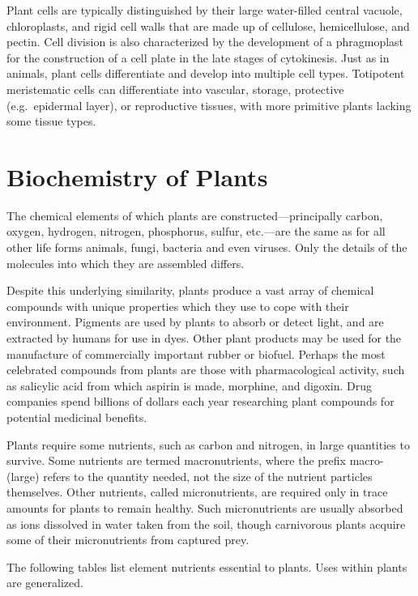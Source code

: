 Plant cells are typically distinguished by their large water-filled central vacuole, chloroplasts, and rigid cell walls that are made up of cellulose, hemicellulose, and pectin. Cell division is also characterized by the development of a phragmoplast for the construction of a cell plate in the late stages of cytokinesis. Just as in animals, plant cells differentiate and develop into multiple cell types. Totipotent meristematic cells can differentiate into vascular, storage, protective (e.g.~epidermal layer), or reproductive tissues, with more primitive plants lacking some tissue types.

\hypertarget{biochemistry-of-plants}{%
\section{Biochemistry of Plants}\label{biochemistry-of-plants}}

The chemical elements of which plants are constructed---principally carbon, oxygen, hydrogen, nitrogen, phosphorus, sulfur, etc.---are the same as for all other life forms animals, fungi, bacteria and even viruses. Only the details of the molecules into which they are assembled differs.

Despite this underlying similarity, plants produce a vast array of chemical compounds with unique properties which they use to cope with their environment. Pigments are used by plants to absorb or detect light, and are extracted by humans for use in dyes. Other plant products may be used for the manufacture of commercially important rubber or biofuel. Perhaps the most celebrated compounds from plants are those with pharmacological activity, such as salicylic acid from which aspirin is made, morphine, and digoxin. Drug companies spend billions of dollars each year researching plant compounds for potential medicinal benefits.

Plants require some nutrients, such as carbon and nitrogen, in large quantities to survive. Some nutrients are termed macronutrients, where the prefix macro- (large) refers to the quantity needed, not the size of the nutrient particles themselves. Other nutrients, called micronutrients, are required only in trace amounts for plants to remain healthy. Such micronutrients are usually absorbed as ions dissolved in water taken from the soil, though carnivorous plants acquire some of their micronutrients from captured prey.

The following tables list element nutrients essential to plants. Uses within plants are generalized.

